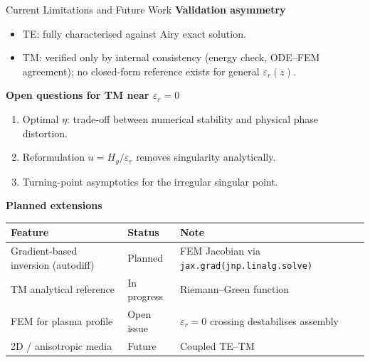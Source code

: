 \documentclass[aspectratio=169,10pt]{beamer}
\begin{document}
\begin{frame}{Current Limitations and Future Work}
  \textbf{Validation asymmetry}
  \begin{itemize}
    \item TE: fully characterised against Airy exact solution.
    \item TM: verified only by internal consistency (energy check, ODE--FEM agreement);
          no closed-form reference exists for general $\varepsilon_r(z)$.
  \end{itemize}

  \vspace{4pt}
  \textbf{Open questions for TM near $\varepsilon_r=0$}
  \begin{enumerate}\small
    \item Optimal $\eta$: trade-off between numerical stability and physical phase distortion.
    \item Reformulation $u=H_y/\varepsilon_r$ removes singularity analytically.
    \item Turning-point asymptotics for the irregular singular point.
  \end{enumerate}

  \vspace{4pt}
  \textbf{Planned extensions}\\[2pt]
  \begin{tabular}{lll}
    \toprule
    Feature & Status & Note \\
    \midrule
    Gradient-based inversion (autodiff) & Planned
      & FEM Jacobian via \texttt{jax.grad(jnp.linalg.solve)} \\
    TM analytical reference & In progress
      & Riemann--Green function \\
    FEM for plasma profile   & Open issue
      & $\varepsilon_r=0$ crossing destabilises assembly \\
    2D / anisotropic media   & Future
      & Coupled TE--TM \\
    \bottomrule
  \end{tabular}
\end{frame}
\end{document}
